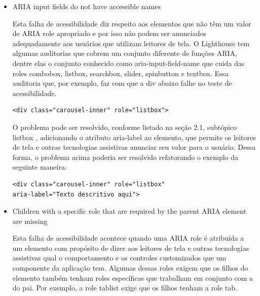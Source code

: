 \documentclass[
	12pt,				%
	openright,			%
	oneside,			%
	a4paper,			%
	chapter=TITLE,		%
	section=TITLE,		%
	subsection=TITLE,	%
	subsubsection=TITLE,%
	english,			%
	brazil				%
	]{abntex2}
\theoremstyle{definition}
\begin{document}
\begin{itemize}

    \item ARIA input fields do not have accessible names
    
Esta falha de acessibilidade diz respeito aos elementos que não têm um valor de ARIA role apropriado e por isso não podem ser anunciados adequadamente aos usuários que utilizam leitores de tela. O Lighthouse tem algumas auditorias que cobrem um conjunto diferente de funções ARIA, dentre elas o conjunto conhecido como aria-input-field-name que cuida das roles combobox, listbox, searchbox, slider, spinbutton e textbox. Essa auditoria que, por exemplo, faz com que a div abaixo falhe no teste de acessibilidade.

\begin{center}
\begin{minipage}{10cm}
\begin{verbatim}
<div class="carousel-inner" role="listbox">
\end{verbatim}
\end{minipage}
\end{center}

O problema pode ser resolvido, conforme listado na seção 2.1, subtópico listbox \cite{world2014accessible}, adicionando o atributo aria-label ao elemento, que permite os leitores de tela e outras tecnologias assistivas anunciar seu valor para o usuário. Dessa forma, o problema acima poderia ser resolvido refatorando o exemplo da seguinte maneira:

\begin{center}
\begin{minipage}{10cm}
\begin{verbatim}
<div class="carousel-inner" role="listbox"
aria-label="Texto descritivo aqui">
\end{verbatim}
\end{minipage}
\end{center}
    
\pagebreak
    
    \item Children with a specific role that are required by the parent ARIA element are missing
    
Esta falha de acessibilidade acontece quando uma ARIA role é atribuída a um elemento com propósito de dizer aos leitores de tela e outras tecnologias assistivas qual o comportamento e os controles customizados que um componente da aplicação tem. Algumas dessas roles exigem que os filhos do elemento também tenham roles específicas que trabalham em conjunto com a do pai. Por exemplo, a role tablist exige que os filhos tenham a role tab.


\end{itemize}
\end{document}
